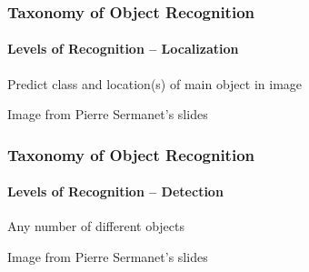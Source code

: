 \documentclass[xetex,professionalfont]{beamer}
\begin{document}

\begin{frame}
\frametitle{Taxonomy of Object Recognition}
\framesubtitle{Levels of Recognition -- Localization}

Predict class and location(s) of main object in image

\bigskip
\begin{center}
    {\centering Image from Pierre Sermanet's slides}
\end{center}

\end{frame}


\begin{frame}
\frametitle{Taxonomy of Object Recognition}
\framesubtitle{Levels of Recognition -- Detection}


Any number of different objects

\bigskip
\begin{center}
    {\centering Image from Pierre Sermanet's slides}
\end{center}

\end{frame}
\end{document}
